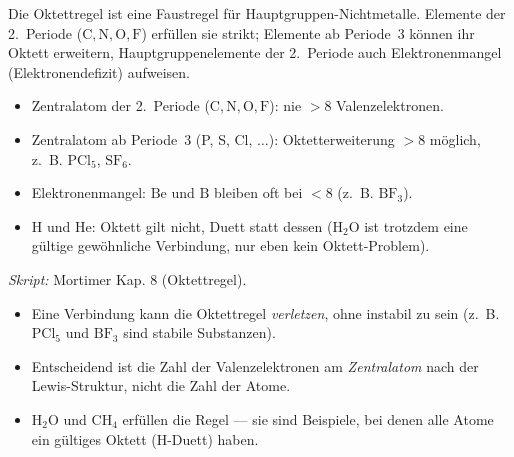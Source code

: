 
Die Oktettregel ist eine Faustregel für Hauptgruppen-Nichtmetalle. Elemente der
2.\ Periode ($\mathrm{C,N,O,F}$) erfüllen sie strikt; Elemente ab Periode~3
können ihr Oktett erweitern, Hauptgruppenelemente der 2.\ Periode auch
Elektronenmangel (Elektronendefizit) aufweisen.

\begin{werkzeugkasten}
\begin{itemize}
  \item Zentralatom der 2.\ Periode ($\mathrm{C,N,O,F}$): nie $>8$
        Valenzelektronen.
  \item Zentralatom ab Periode~3 (P, S, Cl, $\dots$): Oktetterweiterung $>8$
        möglich, z.\ B. $\mathrm{PCl_5}$, $\mathrm{SF_6}$.
  \item Elektronenmangel: $\mathrm{Be}$ und $\mathrm{B}$ bleiben oft bei
        $<8$ (z.\ B. $\mathrm{BF_3}$).
  \item H und He: Oktett gilt nicht, Duett statt dessen ($\mathrm{H_2O}$ ist
        trotzdem eine gültige gewöhnliche Verbindung, nur eben kein
        Oktett-Problem).
\end{itemize}
\textit{Skript:} Mortimer Kap. 8 (Oktettregel).
\end{werkzeugkasten}

\begin{achtung}
\begin{itemize}
  \item Eine Verbindung kann die Oktettregel \textit{verletzen}, ohne
        instabil zu sein (z.\ B. $\mathrm{PCl_5}$ und $\mathrm{BF_3}$ sind
        stabile Substanzen).
  \item Entscheidend ist die Zahl der Valenzelektronen am \textit{Zentralatom}
        nach der Lewis-Struktur, nicht die Zahl der Atome.
  \item $\mathrm{H_2O}$ und $\mathrm{CH_4}$ erfüllen die Regel --- sie sind
        Beispiele, bei denen alle Atome ein gültiges Oktett (H-Duett) haben.
\end{itemize}
\end{achtung}
